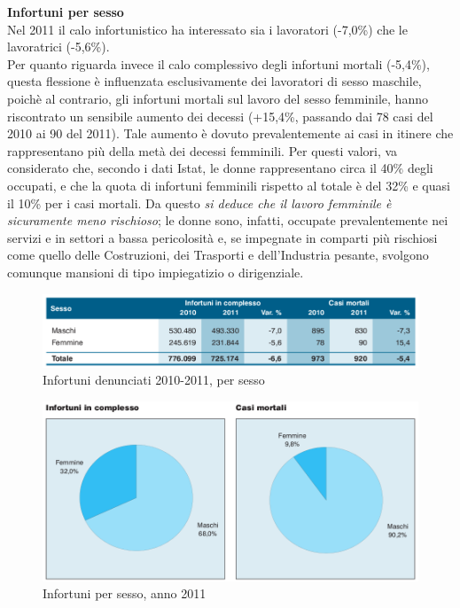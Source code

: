 \textbf{Infortuni per sesso}\\
Nel 2011 il calo infortunistico ha interessato sia i lavoratori (-7,0\%) che le
lavoratrici (-5,6\%).\\
Per quanto riguarda invece il calo complessivo degli infortuni mortali  (-5,4\%), questa flessione è influenzata esclusivamente dei lavoratori di sesso maschile, poichè al contrario, gli infortuni mortali sul lavoro del sesso femminile, hanno riscontrato un sensibile aumento dei decessi (+15,4\%, passando dai 78 casi del 2010 ai 90 del 2011). Tale aumento è dovuto prevalentemente ai casi in itinere che rappresentano più della metà dei decessi femminili.
Per questi valori, va considerato che, secondo i dati Istat, le donne rappresentano circa il 40\% degli
occupati, e che la quota di infortuni femminili rispetto al totale è del 32\% e quasi il 10\% per
i casi mortali. Da questo \textit{si deduce che il lavoro femminile è sicuramente meno rischioso}; le donne
sono, infatti, occupate prevalentemente nei servizi e in settori a bassa pericolosità e, se
impegnate in comparti più rischiosi come quello delle Costruzioni, dei Trasporti e
dell’Industria pesante, svolgono comunque mansioni di tipo impiegatizio o dirigenziale.


\begin{figure}[H]
\centering
\includegraphics[scale=0.5]{images/cap4/analisiDiMercato/infortuniPerSesso1}
\caption{Infortuni denunciati 2010-2011, per sesso}
\end{figure}

\begin{figure}[H]
\centering
\includegraphics[scale=0.5]{images/cap4/analisiDiMercato/infortuniPerSesso2}
\caption{Infortuni per sesso, anno 2011}
\end{figure}

